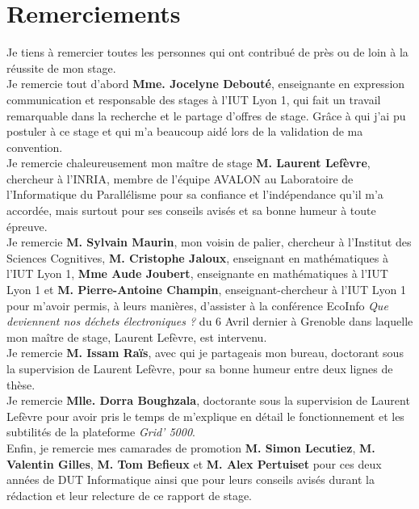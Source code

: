 \newpage\null\thispagestyle{empty}\newpage
\thispagestyle{empty}
\section*{Remerciements}
Je tiens à remercier toutes les personnes qui ont contribué de près ou de loin à la réussite de mon stage. \\

Je remercie tout d'abord \textbf{Mme. Jocelyne Debouté}, enseignante en expression communication et responsable des stages à l'IUT Lyon 1, qui fait un travail remarquable dans la recherche et le partage d'offres de stage. Grâce à qui j'ai pu postuler à ce stage et qui m'a beaucoup aidé lors de la validation de ma convention. \\

Je remercie chaleureusement mon maître de stage \textbf{M. Laurent Lefèvre}, chercheur à l'INRIA, membre de l'équipe AVALON au Laboratoire de l'Informatique du Parallélisme pour sa confiance et l'indépendance qu'il m'a accordée, mais surtout pour ses conseils avisés et sa bonne humeur à toute épreuve.\\ 

Je remercie \textbf{M. Sylvain Maurin}, mon voisin de palier, chercheur à l'Institut des Sciences Cognitives, \textbf{M. Cristophe Jaloux}, enseignant en mathématiques à l'IUT Lyon 1, \textbf{Mme Aude Joubert}, enseignante en mathématiques à l'IUT Lyon 1 et \textbf{M. Pierre-Antoine Champin}, enseignant-chercheur à l'IUT Lyon 1 pour m'avoir permis, à leurs manières, d'assister à la conférence EcoInfo \emph{Que deviennent nos déchets électroniques ?} du 6 Avril dernier à Grenoble dans laquelle mon maître de stage, Laurent Lefèvre, est intervenu.\\

Je remercie \textbf{M. Issam Raïs}, avec qui je partageais mon bureau, doctorant sous la supervision de Laurent Lefèvre, pour sa bonne humeur entre deux lignes de thèse.\\

Je remercie \textbf{Mlle. Dorra Boughzala}, doctorante sous la supervision de Laurent Lefèvre pour avoir pris le temps de m'explique en détail le fonctionnement et les subtilités de la plateforme \emph{Grid' 5000}.\\

Enfin, je remercie mes camarades de promotion \textbf{M. Simon Lecutiez}, \textbf{M. Valentin Gilles}, \textbf{M. Tom Befieux} et \textbf{M. Alex Pertuiset} pour ces deux années de DUT Informatique ainsi que pour leurs conseils avisés durant la rédaction et leur relecture de ce rapport de stage.

